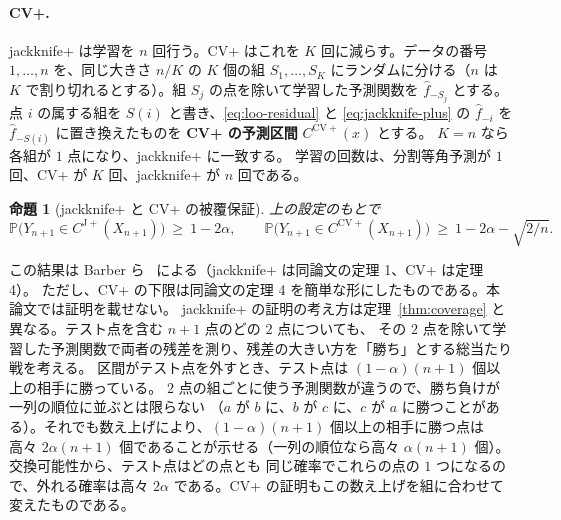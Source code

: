 \documentclass[a4paper,11pt]{jsarticle}
\theoremstyle{definition}
\theoremstyle{plain}
\newtheorem{proposition}[definition]{命題}
\theoremstyle{remark}
\newcommand{\Prob}{\mathbb{P}}
\newcommand{\fhat}{\hat{f}}
\begin{document}
\paragraph{CV+.}
jackknife+ は学習を $n$ 回行う。CV+ はこれを $K$ 回に減らす。データの番号 $1,\dots,n$ を、同じ大きさ $n/K$ の
$K$ 個の組 $S_1,\dots,S_K$ にランダムに分ける（$n$ は $K$ で割り切れるとする）。組 $S_j$ の点を除いて学習した予測関数を
$\fhat_{-S_j}$ とする。点 $i$ の属する組を $S(i)$ と書き、\eqref{eq:loo-residual} と \eqref{eq:jackknife-plus} の
$\fhat_{-i}$ を $\fhat_{-S(i)}$ に置き換えたものを \textbf{CV+ の予測区間} $C^{\mathrm{CV+}}(x)$ とする。
$K=n$ なら各組が $1$ 点になり、jackknife+ に一致する。
学習の回数は、分割等角予測が $1$ 回、CV+ が $K$ 回、jackknife+ が $n$ 回である。

\begin{proposition}[jackknife+ と CV+ の被覆保証]
  \label{prop:jackknife-plus}
  上の設定のもとで
  \begin{equation*}
    \Prob\bigl(Y_{n+1}\in C^{\mathrm{J+}}(X_{n+1})\bigr)\ \ge\ 1-2\alpha,\qquad
    \Prob\bigl(Y_{n+1}\in C^{\mathrm{CV+}}(X_{n+1})\bigr)\ \ge\ 1-2\alpha-\sqrt{2/n}.
  \end{equation*}
\end{proposition}

この結果は Barber ら~\cite{barber2021jackknife} による（jackknife+ は同論文の定理 1、CV+ は定理 4）。
ただし、CV+ の下限は同論文の定理 4 を簡単な形にしたものである。本論文では証明を載せない。
jackknife+ の証明の考え方は定理~\ref{thm:coverage} と異なる。テスト点を含む $n+1$ 点のどの $2$ 点についても、
その $2$ 点を除いて学習した予測関数で両者の残差を測り、残差の大きい方を「勝ち」とする総当たり戦を考える。
区間がテスト点を外すとき、テスト点は $(1-\alpha)(n+1)$ 個以上の相手に勝っている。
$2$ 点の組ごとに使う予測関数が違うので、勝ち負けが一列の順位に並ぶとは限らない
（$a$ が $b$ に、$b$ が $c$ に、$c$ が $a$ に勝つことがある）。それでも数え上げにより、$(1-\alpha)(n+1)$ 個以上の相手に勝つ点は
高々 $2\alpha(n+1)$ 個であることが示せる（一列の順位なら高々 $\alpha(n+1)$ 個）。交換可能性から、テスト点はどの点とも
同じ確率でこれらの点の $1$ つになるので、外れる確率は高々 $2\alpha$ である。CV+ の証明もこの数え上げを組に合わせて変えたものである。
\end{document}
